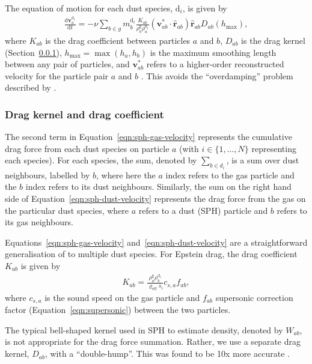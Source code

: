 \documentclass[fleqn,usenatbib]{mnras}
\newcommand{\g}{\mathrm{g}}
\newcommand{\dd}{\mathrm{d}}
\let\vec\bm
\begin{document}
The equation of motion for each dust species, \(\dd_i\), is given by
%
\begin{align}
   \label{eqn:sph-dust-velocity}
   \frac{\dd \vec{v}^{\dd_i}_a}{\dd t} =
      - \nu \sum_{b \in g} m^{\dd_i}_b \frac{K_{ab}}{\rho^{\g}_b \rho^{\dd_i}_a}
      (\vec{v}^{*}_{ab} \cdot \hat{\vec{r}}_{ab}) \hat{\vec{r}}_{ab} D_{ab}(h_{\max}),
\end{align}
%
where \(K_{ab}\) is the drag coefficient between particles \(a\) and \(b\),
\(D_{ab}\) is the drag kernel (Section~\ref{sec:drag-kernel}), \(h_{\max} =
\max(h_a, h_b)\) is the maximum smoothing length between any pair of particles,
and \(\vec{v}^{*}_{ab}\) refers to a higher-order reconstructed velocity for the
particle pair \(a\) and \(b\) \citep{Price2020MNRAS.495.3929P}. This avoids the
``overdamping'' problem described by \citet{Laibe2012MNRAS.420.2345L}.


\subsubsection{Drag kernel and drag coefficient}
\label{sec:drag-kernel}

The second term in Equation~\ref{eqn:sph-gas-velocity} represents the cumulative
drag force from each dust species on particle \(a\) (with \(i \in \{1, \ldots,
N\}\) representing each species). For each species, the sum, denoted by
\(\sum_{b \in d_i}\), is a sum over dust neighbours, labelled by \(b\), where
here the \(a\) index refers to the gas particle and the \(b\) index refers to
its dust neighbours. Similarly, the sum on the right hand side of
Equation~\ref{eqn:sph-dust-velocity} represents the drag force from the gas on
the particular dust species, where \(a\) refers to a dust (SPH) particle and
\(b\) refers to its gas neighbours.

Equations~\ref{eqn:sph-gas-velocity} and~\ref{eqn:sph-dust-velocity} are a
straightforward generalisation of \citet{Laibe2012MNRAS.420.2345L} to multiple
dust species. For Epstein drag, the drag coefficient \(K_{ab}\) is given by
%
\begin{align}
   K_{ab} = \frac{\rho^{\g}_a \rho^{\dd_i}_b}{\varrho_{\mathrm{eff}} s_i} c_{s,a} f_{ab},
\end{align}
%
where \(c_{s,a}\) is the sound speed on the gas particle and \(f_{ab}\)
supersonic correction factor (Equation~\ref{eqn:supersonic}) between the two
particles.

The typical bell-shaped kernel used in SPH to estimate density, denoted by
\(W_{ab}\), is not appropriate for the drag force summation. Rather, we use a
separate drag kernel, \(D_{ab}\), with a ``double-hump''. This was found to be
10x more accurate \citep{Laibe2012MNRAS.420.2345L}.
\end{document}

